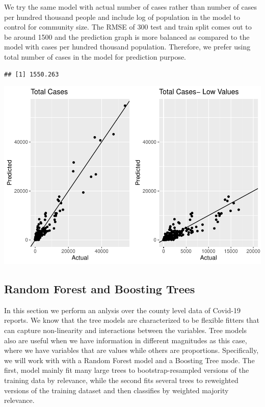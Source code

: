\documentclass[
]{article}
\begin{document}
We try the same model with actual number of cases rather than number of
cases per hundred thousand people and include log of population in the
model to control for community size. The RMSE of 300 test and train
split comes out to be around 1500 and the prediction graph is more
balanced as compared to the model with cases per hundred thousand
population. Therefore, we prefer using total number of cases in the
model for prediction purpose.

\begin{verbatim}
## [1] 1550.263
\end{verbatim}

\includegraphics{covid_tree_analysis_files/figure-latex/unnamed-chunk-11-1.pdf}

\hypertarget{random-forest-and-boosting-trees}{%
\subsection{Random Forest and Boosting
Trees}\label{random-forest-and-boosting-trees}}

In this section we perform an anlysis over the county level data of
Covid-19 reports. We know that the tree models are characterized to be
flexible fitters that can capture non-linearity and interactions between
the variables. Tree models also are useful when we have information in
different magnitudes as this case, where we have variables that are
values while others are proportions. Specifically, we will work with
with a Random Forest model and a Boosting Tree mode. The first, model
mainly fit many large trees to bootstrap-resampled versions of the
training data by relevance, while the second fits several trees to
reweighted versions of the training dataset and then classifies by
weighted majority relevance.
\end{document}
